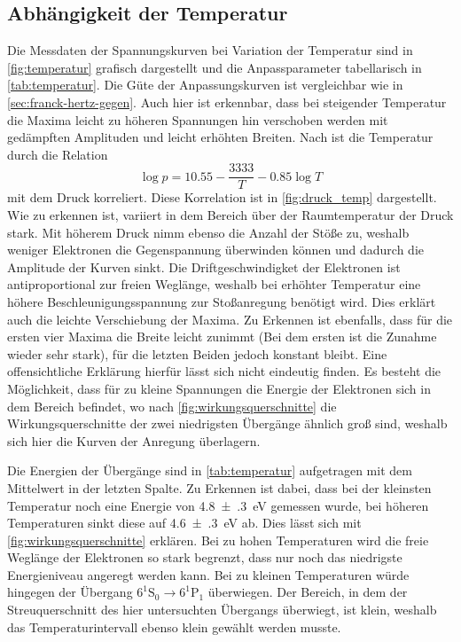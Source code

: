 \subsection{Abhängigkeit der Temperatur}
Die Messdaten der Spannungskurven bei Variation der Temperatur 
sind in \cref{fig:temperatur} grafisch dargestellt und die Anpassparameter 
tabellarisch in \cref{tab:temperatur}. Die Güte der Anpassungskurven ist 
vergleichbar wie in \cref{sec:franck-hertz-gegen}. Auch hier ist erkennbar, dass 
bei steigender Temperatur die Maxima leicht zu höheren Spannungen hin verschoben 
werden mit gedämpften Amplituden und leicht erhöhten Breiten. Nach \cite{skript}
ist die Temperatur durch die Relation 
\begin{equation*}
    \log p = \num{10.55}-\frac{3333}{T}-\num{0.85}\log T
\end{equation*}
mit dem Druck korreliert. Diese Korrelation ist in \cref{fig:druck_temp} dargestellt. Wie zu 
erkennen ist, variiert in dem Bereich über der Raumtemperatur der Druck stark. Mit 
höherem Druck nimm ebenso die Anzahl der Stöße zu, weshalb weniger Elektronen die Gegenspannung
überwinden können und dadurch die Amplitude der Kurven sinkt. Die Driftgeschwindigket 
der Elektronen ist antiproportional zur freien Weglänge, weshalb bei erhöhter Temperatur 
eine höhere Beschleunigungsspannung zur Stoßanregung benötigt wird. Dies erklärt auch 
die leichte Verschiebung der Maxima. Zu Erkennen ist ebenfalls, dass für die ersten 
vier Maxima die Breite leicht zunimmt (Bei dem ersten ist die Zunahme wieder sehr stark), 
für die letzten Beiden jedoch konstant bleibt. 
Eine offensichtliche Erklärung hierfür lässt sich nicht eindeutig finden. Es besteht 
die Möglichkeit, dass für zu kleine Spannungen die Energie der Elektronen sich in
dem Bereich befindet, wo nach \cref{fig:wirkungsquerschnitte} die Wirkungsquerschnitte
der zwei niedrigsten Übergänge ähnlich groß sind, weshalb sich hier die 
Kurven der Anregung überlagern.

Die Energien der Übergänge sind in \cref{tab:temperatur} aufgetragen mit dem Mittelwert 
in der letzten Spalte. Zu Erkennen ist dabei, dass bei der kleinsten Temperatur noch eine 
Energie von \SI{4.8(3)}{\electronvolt} gemessen wurde, bei höheren Temperaturen 
sinkt diese auf \SI{4.6(3)}{\electronvolt} ab. Dies lässt sich mit \cref{fig:wirkungsquerschnitte}
erklären. Bei zu hohen Temperaturen wird die freie Weglänge der Elektronen so stark begrenzt, 
dass nur noch das niedrigste Energieniveau angeregt werden kann. Bei zu kleinen Temperaturen 
würde hingegen der Übergang $6^1\mathrm S_0\rightarrow 6^1\mathrm P_1$ überwiegen. Der Bereich,
in dem der Streuquerschnitt des hier untersuchten Übergangs überwiegt, ist klein, weshalb 
das Temperaturintervall ebenso klein gewählt werden musste.

